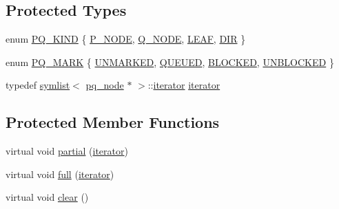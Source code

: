 \subsection*{Protected Types}
\begin{DoxyCompactItemize}
\item 
enum \mbox{\hyperlink{classpq__node_a96827bdca8bf81d20213405dd27f8fa6}{P\+Q\+\_\+\+K\+I\+ND}} \{ \mbox{\hyperlink{classpq__node_a96827bdca8bf81d20213405dd27f8fa6a0ea3d0eae8dd06c7039082054828ce77}{P\+\_\+\+N\+O\+DE}}, 
\mbox{\hyperlink{classpq__node_a96827bdca8bf81d20213405dd27f8fa6ae682b144f87217774df399363d0ef410}{Q\+\_\+\+N\+O\+DE}}, 
\mbox{\hyperlink{classpq__node_a96827bdca8bf81d20213405dd27f8fa6a80289f856abee0f9cb17852111ba9991}{L\+E\+AF}}, 
\mbox{\hyperlink{classpq__node_a96827bdca8bf81d20213405dd27f8fa6a5afa3e7100ee720a1569cfff090a210d}{D\+IR}}
 \}
\item 
enum \mbox{\hyperlink{classpq__node_a6236b20cd5f6cc02cb5f637ed34c96d9}{P\+Q\+\_\+\+M\+A\+RK}} \{ \mbox{\hyperlink{classpq__node_a6236b20cd5f6cc02cb5f637ed34c96d9a7fbe5f6a363f9f2b5a154c61b2389d59}{U\+N\+M\+A\+R\+K\+ED}}, 
\mbox{\hyperlink{classpq__node_a6236b20cd5f6cc02cb5f637ed34c96d9a8fcc16097c37da3379fcd0a0c16fe169}{Q\+U\+E\+U\+ED}}, 
\mbox{\hyperlink{classpq__node_a6236b20cd5f6cc02cb5f637ed34c96d9a70312622ded9f04f068838ec195fc53c}{B\+L\+O\+C\+K\+ED}}, 
\mbox{\hyperlink{classpq__node_a6236b20cd5f6cc02cb5f637ed34c96d9a8a88820f8cee58f43fef7160cdf1d7dc}{U\+N\+B\+L\+O\+C\+K\+ED}}
 \}
\item 
typedef \mbox{\hyperlink{classsymlist}{symlist}}$<$ \mbox{\hyperlink{classpq__node}{pq\+\_\+node}} $\ast$ $>$\+::\mbox{\hyperlink{classpq__node_a34898c9eb1527787c07e8ebefd6bfba5}{iterator}} \mbox{\hyperlink{classpq__node_a34898c9eb1527787c07e8ebefd6bfba5}{iterator}}
\end{DoxyCompactItemize}
\subsection*{Protected Member Functions}
\begin{DoxyCompactItemize}
\item 
virtual void \mbox{\hyperlink{classpq__node_aa6830ab47a280f41fe61b7d2f8b508bb}{partial}} (\mbox{\hyperlink{classpq__node_a34898c9eb1527787c07e8ebefd6bfba5}{iterator}})
\item 
virtual void \mbox{\hyperlink{classpq__node_af1ba861293e4493dba7cc2c9332fee76}{full}} (\mbox{\hyperlink{classpq__node_a34898c9eb1527787c07e8ebefd6bfba5}{iterator}})
\item 
virtual void \mbox{\hyperlink{classpq__node_a13100e0b030cc047f382d9ddf6a44f4a}{clear}} ()
\end{DoxyCompactItemize}
